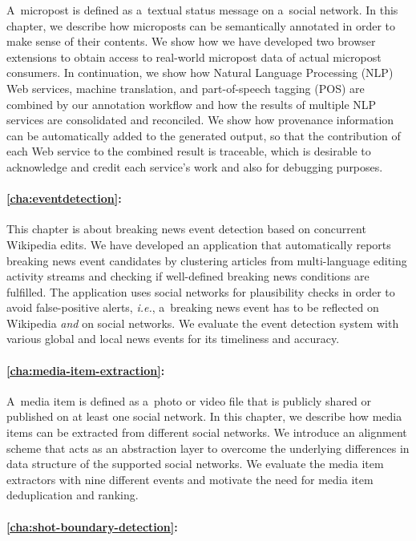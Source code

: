 A~micropost is defined as a~textual status message
on a~social network.
In this chapter, we describe how microposts can be semantically annotated
in order to make sense of their contents.
We show how we have developed two browser extensions to obtain access
to real-world micropost data of actual micropost consumers.
In continuation, we show how Natural Language Processing (NLP)
Web services, machine translation, and part-of-speech tagging (POS)
are combined by our annotation workflow
and how the results of multiple NLP services are consolidated and reconciled.
We show how provenance information can be automatically added
to the generated output, so that the contribution
of each Web service to the combined result is traceable,
which is desirable to acknowledge and credit each service's work 
and also for debugging purposes.

\paragraph{\autoref{cha:eventdetection}:}

This chapter is about breaking news event detection 
based on concurrent Wikipedia edits.
We have developed an application that automatically
reports breaking news event candidates by clustering 
articles from multi-language editing activity streams
and checking if well-defined breaking news conditions are fulfilled.
The application uses social networks for plausibility checks
in order to avoid false-positive alerts,
\emph{i.e.}, a~breaking news event has to be reflected on Wikipedia
\emph{and} on social networks.
We evaluate the event detection system with various
global and local news events for its timeliness and accuracy.

\paragraph{\autoref{cha:media-item-extraction}:}

A~media item is defined as
a~photo or video file that is publicly shared or published
on at least one social network.
In this chapter, we describe how media items can be extracted
from different social networks.
We introduce an alignment scheme that acts as an abstraction layer
to overcome the underlying differences in data structure of 
the supported social networks.
We evaluate the media item extractors with nine different events
and motivate the need for media item deduplication and ranking.

\paragraph{\autoref{cha:shot-boundary-detection}:}

